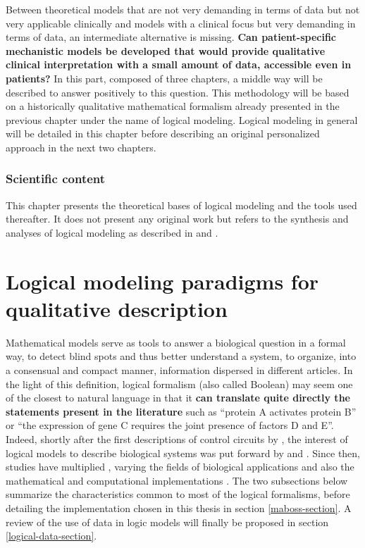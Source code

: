 \documentclass[a4paper,12pt,twoside,onecolumn,openright,final,oldfontcommands]{memoir}
\let\BeginKnitrBlock\begin \let\EndKnitrBlock\end
\begin{document}
Between theoretical models that are not very demanding in terms of data
but not very applicable clinically and models with a clinical focus but
very demanding in terms of data, an intermediate alternative is missing.
\textbf{Can patient-specific mechanistic models be developed that would
provide qualitative clinical interpretation with a small amount of data,
accessible even in patients?} In this part, composed of three chapters,
a middle way will be described to answer positively to this question.
This methodology will be based on a historically qualitative
mathematical formalism already presented in the previous chapter under
the name of logical modeling. Logical modeling in general will be
detailed in this chapter before describing an original personalized
approach in the next two chapters.

\BeginKnitrBlock{summarybox}
\subsubsection*{Scientific content}\label{scientific-content-1}

This chapter presents the theoretical bases of logical modeling and the
tools used thereafter. It does not present any original work but refers
to the synthesis and analyses of logical modeling as described in
\citet{beal2019personalization} and \citet{beal2020modelisation}.
\EndKnitrBlock{summarybox}

\section{Logical modeling paradigms for qualitative
description}\label{logical-modeling-paradigms-for-qualitative-description}

Mathematical models serve as tools to answer a biological question in a
formal way, to detect blind spots and thus better understand a system,
to organize, into a consensual and compact manner, information dispersed
in different articles. In the light of this definition, logical
formalism (also called Boolean) may seem one of the closest to natural
language in that it \textbf{can translate quite directly the statements
present in the literature} such as ``protein A activates protein B'' or
``the expression of gene C requires the joint presence of factors D and
E''. Indeed, shortly after the first descriptions of control circuits by
\citet{jacob1961genetic}, the interest of logical models to describe
biological systems was put forward by \citet{kauffman1969homeostasis}
and \citet{thomas1973boolean}. Since then, studies have multiplied
\citep{thomas1990biological}, varying the fields of biological
applications and also the mathematical and computational implementations
\citep{naldi2018colomoto}. The two subsections below summarize the
characteristics common to most of the logical formalisms, before
detailing the implementation chosen in this thesis in section
\ref{maboss-section}. A review of the use of data in logic models will
finally be proposed in section \ref{logical-data-section}.
\end{document}
